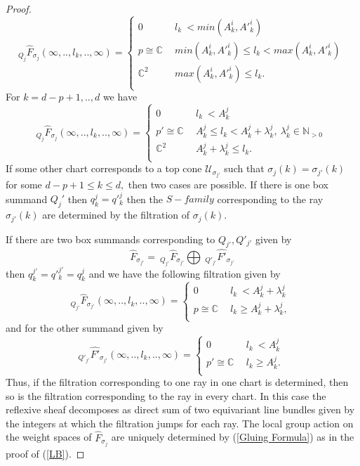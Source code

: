 \documentclass[10pt]{amsart}
\numberwithin{equation}{subsection}
\begin{document}
\begin{proof}
$$_{Q_j}\hat{F}_{\sigma_j}(\infty,..,l_k,..,\infty)=\left\{ 
\begin{array}{ll}
0 & \ \ l_k\ <  min(A^i_k,A'^i_k) \ \\[2ex]
p \cong \mathbb{C} & \ \ min(A^i_k,A'^i_k)\leq l_k < max(A^i_k,A'^i_k) \ \\[2ex]
\mathbb{C}^2 & \ \   max(A^i_k,A'^i_k)\leq l_k.\ \\
\end{array}
\right.$$ 
For $k=d-p+1,..,d$  we have 
$$_{Q_j}\hat{F}_{\sigma_j}(\infty,..,l_k,..,\infty)=\left\{ 
\begin{array}{ll}
0 & \ \ l_k\ < A^j_k \ \\[2ex]
p' \cong \mathbb{C} & \ \ A^j_k \leq l_k < A^j_k+\lambda^j_k,\  \lambda^j_k \in \mathbb{N}_{>0}\ \\[2ex]
\mathbb{C}^2 & \ \   A^j_k+\lambda^j_k\leq l_k.\ \\
\end{array}
\right.$$ 
If some other chart corresponds to a top cone $\mathscr{U}_{\sigma_{j'}}$ such that $\sigma_j(k)=\sigma_{j'}(k)$ for some $d-p+1\leq k\leq d,$ then two cases are possible. If there is one box summand $Q_j'$ then $q^j_k=q'^j_k$ then the $S-family$ corresponding to the ray $\sigma_{j'}(k)$ are determined by the filtration of $\sigma_j(k).$\par If there are two box summands corresponding to $Q_{j'},Q'_{j'}$ given by $$\hat{F}_{\sigma_{j'}}=\ _{Q_{j'}}\hat{F}_{\sigma_{j'}}\bigoplus\ _{Q'_{j'}}\hat{F'}_{\sigma_{j'}}$$ then $q^{j'}_k=q'^{j'}_k=q^j_k$ and we have the following filtration given by
$$_{Q_{j'}}\hat{F}_{\sigma_{j'}}(\infty,..,l_k,..,\infty)=\left\{ 
\begin{array}{ll}
0 & \ \ l_k\ < A^j_k+\lambda^j_k \ \\[2ex]
p \cong \mathbb{C} & \ \  l_k \geq A^j_k+\lambda^j_k, \ \\[2ex]
\end{array}
\right.$$ 
and for the other summand given by
$$_{Q'_{j'}}\hat{F'}_{\sigma_{j'}}(\infty,..,l_k,..,\infty)=\left\{ 
\begin{array}{ll}
0 & \ \ l_k\ < A^j_k \ \\[2ex]
p' \cong \mathbb{C} & \ \  l_k \geq A^j_k. \ \\[2ex]
\end{array}
\right.$$ 
Thus, if the filtration corresponding to one ray in one chart is determined, then so is the filtration corresponding to the ray in every chart. In this case the reflexive sheaf decomposes as direct sum of two equivariant line bundles given by the integers at which the filtration jumps for each ray. The local group action on the weight spaces of $\hat F_{\sigma_j}$ are uniquely determined by (\ref{Gluing Formula}) as in the proof of (\ref{LB}).\par

\end{proof}
\end{document}

